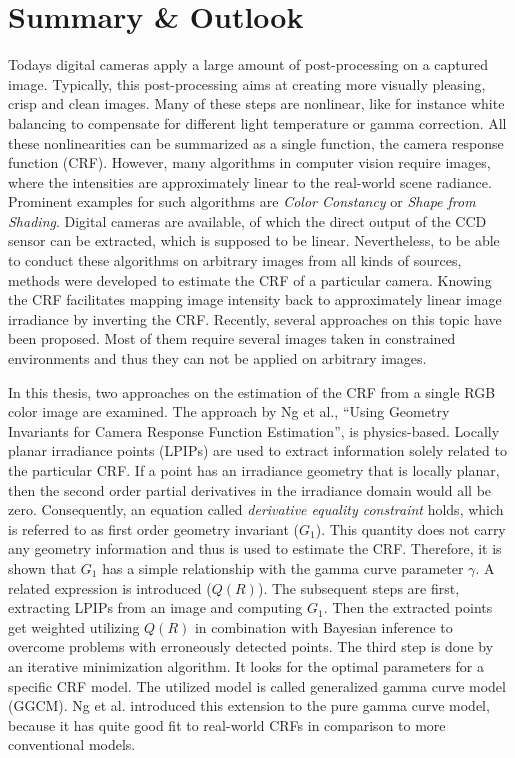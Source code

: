 \chapter{Summary \& Outlook}
\label{chap:summaryoutlook}

Todays digital cameras apply a large amount of post-processing on a captured image. Typically, this post-processing aims at creating more visually pleasing, crisp and clean images. Many of these steps are nonlinear, like for instance white balancing to compensate for different light temperature or gamma correction. All these nonlinearities can be summarized as a single function, the camera response function (CRF). However, many algorithms in computer vision require images, where the intensities are approximately linear to the real-world scene radiance. Prominent examples for such algorithms are \emph{Color Constancy} or \emph{Shape from Shading}. Digital cameras are available, of which the direct output of the CCD sensor can be extracted, which is supposed to be linear. Nevertheless, to be able to conduct these algorithms on arbitrary images from all kinds of sources, methods were developed to estimate the CRF of a particular camera. Knowing the CRF facilitates mapping image intensity back to approximately linear image irradiance by inverting the CRF. Recently, several approaches on this topic have been proposed. Most of them require several images taken in constrained environments and thus they can not be applied on arbitrary images.

In this thesis, two approaches on the estimation of the CRF from a single RGB color image are examined. The approach by Ng et \hbox{al.}, ``Using Geometry Invariants for Camera Response Function Estimation'', is physics-based. Locally planar irradiance points (LPIPs) are used to extract information solely related to the particular CRF. If a point has an irradiance geometry that is locally planar, then the second order partial derivatives in the irradiance domain would all be zero. Consequently, an equation called \emph{derivative equality constraint} holds, which is referred to as first order geometry invariant ($G_1$). This quantity does not carry any geometry information and thus is used to estimate the CRF. Therefore, it is shown that $G_1$ has a simple relationship with the gamma curve parameter $\gamma$. A related expression is introduced ($Q(R)$). The subsequent steps are first, extracting LPIPs from an image and computing $G_1$. Then the extracted points get weighted utilizing $Q(R)$ in combination with Bayesian inference to overcome problems with erroneously detected points. The third step is done by an iterative minimization algorithm. It looks for the optimal parameters for a specific CRF model. The utilized model is called generalized gamma curve model (GGCM). Ng et \hbox{al.} introduced this extension to the pure gamma curve model, because it has quite good fit to real-world CRFs in comparison to more conventional models.

